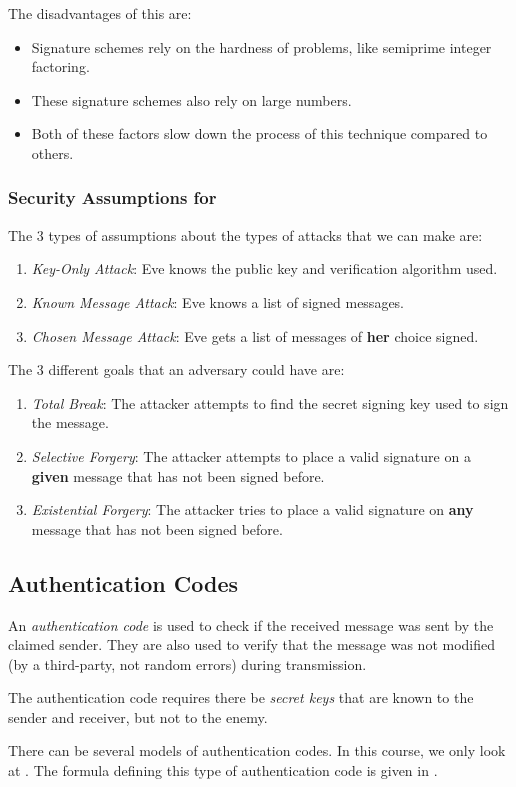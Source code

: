The disadvantages of this are:
\begin{itemize}[noitemsep]
\item Signature schemes rely on the hardness of problems, like semiprime integer factoring.
\item These signature schemes also rely on large numbers.
\item Both of these factors slow down the process of this technique compared to others.
\end{itemize}

\subsubsection{Security Assumptions for }\label{subsubsec:Security_Assumptions_Digital_Signatures}
The 3 types of assumptions about the types of attacks that we can make are:
\begin{enumerate}[noitemsep]
\item \emph{Key-Only Attack}: Eve knows the public key and verification algorithm used.
\item \emph{Known Message Attack}: Eve knows a list of signed messages.
\item \emph{Chosen Message Attack}: Eve gets a list of messages of \textbf{her} choice signed.
\end{enumerate}

The 3 different goals that an adversary could have are:
\begin{enumerate}[noitemsep]
\item \emph{Total Break}: The attacker attempts to find the secret signing key used to sign the message.
\item \emph{Selective Forgery}: The attacker attempts to place a valid signature on a \textbf{given} message that has not been signed before.
\item \emph{Existential Forgery}: The attacker tries to place a valid signature on \textbf{any} message that has not been signed before.
\end{enumerate}

\subsection{Authentication Codes}\label{subsec:Authentication_Codes}
\begin{definition}\label{def:Authentication_Code}
  An \emph{authentication code} is used to check if the received message was sent by the claimed sender.
  They are also used to verify that the message was not modified (by a third-party, not random errors) during transmission.

  The authentication code requires there be \emph{secret keys} that are known to the sender and receiver, but not to the enemy.

  There can be several models of authentication codes.
  In this course, we only look at .
  The formula defining this type of authentication code is given in .
\end{definition}

